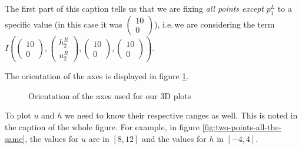 \documentclass{article}
\begin{document}
The first part of this caption tells us that we are fixing \emph{all points except} $p_1^L$ to a specific value (in this case it was $
\begin{pmatrix}
  10 \\ 0
\end{pmatrix}
$), i.e.\,we are considering the term $I\left(
  \begin{pmatrix}
    10 \\ 0
  \end{pmatrix},
  \begin{pmatrix}
    h_2^R \\ u_2^R
  \end{pmatrix}, 
  \begin{pmatrix}
    10 \\ 0
  \end{pmatrix},
  \begin{pmatrix}
    10 \\ 0
  \end{pmatrix}
\right)$.


The orientation of the axes is displayed in figure \ref{fig:orientation-of-axes}.

\begin{figure}[th]
  \centering
  \caption{Orientation of the axes used for our 3D plots}
  \label{fig:orientation-of-axes}
\end{figure}

To plot $u$ and $h$ we need to know their respective ranges as well. This is noted in the caption of the whole figure. For example, in figure \ref{fig:two-points-all-the-same}, the values for $u$ are in $[8, 12]$ and the values for $h$ in $[-4,4]$.

\end{document}
